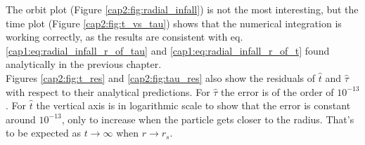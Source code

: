 The orbit plot (Figure \ref{cap2:fig:radial_infall}) is not the most
interesting, but the time plot (Figure \ref{cap2:fig:t_vs_tau}) shows that the
numerical integration is working correctly, as the results are consistent with
eq. \ref{cap1:eq:radial_infall_r_of_tau} and \ref{cap1:eq:radial_infall_r_of_t}
found analytically in the previous chapter. \\
Figures \ref{cap2:fig:t_res} and \ref{cap2:fig:tau_res} also show the residuals
of $\hat t$ and $\hat \tau$ with respect to their analytical predictions.
For $\hat \tau$ the error is of the order of $10^{-13}$.
For $\hat t$ the vertical axis is in logarithmic scale to show that the error is
constant around $10^{-13}$, only to increase when the particle gets closer to
the \Sh radius.
That's to be expected as $t \rightarrow \infty$ when $r \rightarrow r_s$.

